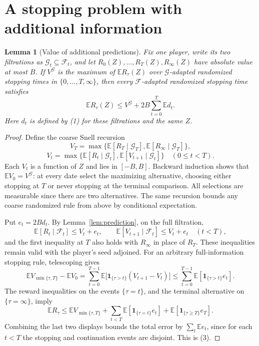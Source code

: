 \documentclass[11pt]{article}
\newtheorem{lemma}[theorem]{Lemma}
\theoremstyle{remark}\newtheorem{remark}[theorem]{Remark}
\newcommand{\E}{\mathbb E}
\begin{document}
\section*{A stopping problem with additional information}
\begin{lemma}[Value of additional predictions]\label{lem:stopping}
Fix one player, write its two filtrations as $\mathcal G_t\subseteq\mathcal F_t$, and let $R_0(Z),\ldots,R_T(Z),R_\infty(Z)$ have absolute value at most $B$. If $V^{\mathcal G}$ is the maximum of $\E R_\tau(Z)$ over $\mathcal G$-adapted randomized stopping times in $\{0,\ldots,T,\infty\}$, then every $\mathcal F$-adapted randomized stopping time satisfies
\[
 \E R_\tau(Z)\leq V^{\mathcal G}+2B\sum_{t=0}^T\E d_t.         \tag{3}
\]
Here $d_t$ is defined by (1) for these filtrations and the same $Z$.
\end{lemma}
\begin{proof}
Define the coarse Snell recursion
\[
 V_T=\max\{\E[R_T\mid\mathcal G_T],\E[R_\infty\mid\mathcal G_T]\},
\]
\[
 V_t=\max\{\E[R_t\mid\mathcal G_t],\E[V_{t+1}\mid\mathcal G_t]\}
 \quad(0\leq t<T).
\]
Each $V_t$ is a function of $Z$ and lies in $[-B,B]$. Backward induction shows that $\E V_0=V^{\mathcal G}$: at every date select the maximizing alternative, choosing either stopping at $T$ or never stopping at the terminal comparison. All selections are measurable since there are two alternatives. The same recursion bounds any coarse randomized rule from above by conditional expectation.

Put $e_t=2Bd_t$. By Lemma~\ref{lem:prediction}, on the full filtration,
\[
 \E[R_t\mid\mathcal F_t]\leq V_t+e_t,\qquad
 \E[V_{t+1}\mid\mathcal F_t]\leq V_t+e_t\quad(t<T),
\]
and the first inequality at $T$ also holds with $R_\infty$ in place of $R_T$. These inequalities remain valid with the player's seed adjoined. For an arbitrary full-information stopping rule, telescoping gives
\[
 \E V_{\min\{\tau,T\}}-\E V_0
 =\sum_{t=0}^{T-1}\E\bigl[\mathbf1_{\{\tau>t\}}(V_{t+1}-V_t)\bigr]
 \leq\sum_{t=0}^{T-1}\E[\mathbf1_{\{\tau>t\}}e_t].
\]
The reward inequalities on the events $\{\tau=t\}$, and the terminal alternative on $\{\tau=\infty\}$, imply
\[
 \E R_\tau\leq\E V_{\min\{\tau,T\}}
 +\sum_{t<T}\E[\mathbf1_{\{\tau=t\}}e_t]
 +\E[\mathbf1_{\{\tau\geq T\}}e_T].
\]
Combining the last two displays bounds the total error by $\sum_t\E e_t$, since for each $t<T$ the stopping and continuation events are disjoint. This is (3).
\end{proof}
\end{document}
